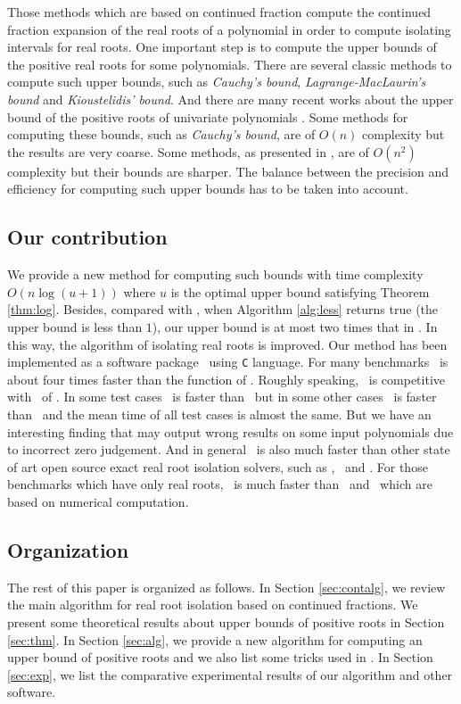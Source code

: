 Those methods which are based on  continued fraction compute the continued fraction expansion of the real roots of a polynomial in order to  compute isolating intervals for real roots. One important step
is to  compute the upper bounds of the positive real roots for some polynomials. There are  several classic methods to compute such upper bounds, such as {\em Cauchy's bound}, {\em Lagrange-MacLaurin's  bound} and {\em Kioustelidis' bound}. And there are many recent works about the upper bound of the positive roots of univariate polynomials \cite{hong98,ste05,akr08}. Some methods for computing these bounds,  such as {\em Cauchy's bound}, are of $O(n)$ complexity but the results are very coarse. Some methods, as presented in  \cite{akr08}, are of $O(n^2)$ complexity but their bounds are sharper. The balance between the precision and efficiency for computing such upper bounds has to be taken into account.
\subsection{Our contribution}
We provide a new method for computing such bounds with time complexity $O(n\log(u+1))$ %
where $u$ is the optimal upper bound satisfying Theorem \ref{thm:log}. Besides, compared
with \cite{akr08}, when  Algorithm \ref{alg:less} returns true (the upper bound is less than $1$), our upper bound is at most two times that in \cite{akr08}. In this way, the algorithm of   isolating real roots is improved.  Our  method has been implemented as a  software package \froot\ using \texttt{C} language. For many benchmarks \froot \  is about four  times
faster   than  the function {\tt \REALROOT} of \MAPLE. Roughly speaking, \froot\ is competitive with \inte\ of \MM. In some test cases \froot\ is faster than \inte\ but in some other cases \inte\ is faster than \froot\ and the mean time of all test cases is almost the same. But we have an interesting finding that {\tt \inte} may output wrong results on some input polynomials due to incorrect zero judgement. %
And in general \froot\ is also much faster than other state of art
open source exact real root isolation solvers, such as \cf, \AND\ and \SLV. For those  benchmarks which  have only real roots, \froot\ is much faster than \sle\ and \eign\ which are based on numerical computation.

\subsection{Organization}

The rest of this paper is organized as follows. In Section \ref{sec:contalg}, we review the
main algorithm for real root isolation based on  continued fractions. We present some theoretical results about upper bounds of positive roots in Section \ref{sec:thm}.  In Section \ref{sec:alg}, we provide a new algorithm for
computing an upper bound of positive roots and we also list some tricks used in \froot.  In Section \ref{sec:exp}, we  list the comparative experimental results of our algorithm and other software.
